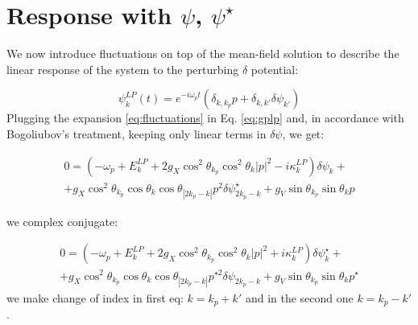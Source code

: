 \documentclass[a4paper,prb,10pt,aps,twocolumn]{revtex4-1}
\begin{document}
\appendix
\section{Response with $\psi$, $\psi^{\star}$}

We now introduce fluctuations on top of the mean-field solution to
describe the linear response of the system to the perturbing $\delta$
potential:

\begin{equation}
\psi_{k}^{LP}(t)=e^{-i\omega_{p}t}\left(\delta_{k,k_{p}}p+\delta_{k,k'}\delta\psi_{k'}\right)\label{eq:fluctuations}
\end{equation}
Plugging the expansion \ref{eq:fluctuations} in Eq. \ref{eq:gplp}
and, in accordance with Bogoliubov's treatment, keeping only linear
terms in $\delta\psi$, we get:

\begin{multline}
0=\left(-\omega_{p}+E_{k}^{LP}+2g_{X}\cos^{2}\theta_{k_{p}}\cos^{2}\theta_{k}|p|^{2}-i\kappa_{k}^{LP}\right)\delta\psi_{k}+\\
+g_{X}\cos^{2}\theta_{k_{p}}\cos\theta_{k}\cos\theta_{|2k_{p}-k|}p^{2}\delta\psi_{2k_{p}-k}^{\star}+g_{V}\sin\theta_{k_{p}}\sin\theta_{k}p
\end{multline}

we complex conjugate:

\begin{multline}
0=\left(-\omega_{p}+E_{k}^{LP}+2g_{X}\cos^{2}\theta_{k_{p}}\cos^{2}\theta_{k}|p|^{2}+i\kappa_{k}^{LP}\right)\delta\psi_{k}^{\star}+\\
+g_{X}\cos^{2}\theta_{k_{p}}\cos\theta_{k}\cos\theta_{|2k_{p}-k|}p^{\star2}\delta\psi_{2k_{p}-k}+g_{V}\sin\theta_{k_{p}}\sin\theta_{k}p^{\star}
\end{multline}
we make change of index in first eq: $k=k_{p}+k'$ and in the second one  $k=k_{p}-k'$.

\end{document}
